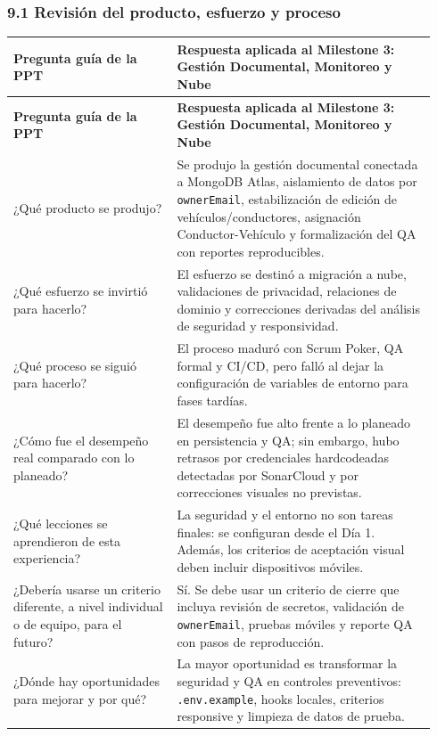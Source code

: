 \documentclass[11pt,a4paper]{article}
\begin{document}
\subsubsection{9.1 Revisión del producto, esfuerzo y proceso}

\begingroup
\small
\setlength{\tabcolsep}{3pt}
\begin{longtable}{P{0.36\linewidth}P{0.58\linewidth}}
\toprule
\textbf{Pregunta guía de la PPT} & \textbf{Respuesta aplicada al Milestone 3: Gestión Documental, Monitoreo y Nube} \\
\midrule
\endfirsthead
\toprule
\textbf{Pregunta guía de la PPT} & \textbf{Respuesta aplicada al Milestone 3: Gestión Documental, Monitoreo y Nube} \\
\midrule
\endhead
\bottomrule
\endlastfoot
¿Qué producto se produjo? & Se produjo la gestión documental conectada a MongoDB Atlas, aislamiento de datos por \texttt{ownerEmail}, estabilización de edición de vehículos/conductores, asignación Conductor-Vehículo y formalización del QA con reportes reproducibles. \\
¿Qué esfuerzo se invirtió para hacerlo? & El esfuerzo se destinó a migración a nube, validaciones de privacidad, relaciones de dominio y correcciones derivadas del análisis de seguridad y responsividad. \\
¿Qué proceso se siguió para hacerlo? & El proceso maduró con Scrum Poker, QA formal y CI/CD, pero falló al dejar la configuración de variables de entorno para fases tardías. \\
¿Cómo fue el desempeño real comparado con lo planeado? & El desempeño fue alto frente a lo planeado en persistencia y QA; sin embargo, hubo retrasos por credenciales hardcodeadas detectadas por SonarCloud y por correcciones visuales no previstas. \\
¿Qué lecciones se aprendieron de esta experiencia? & La seguridad y el entorno no son tareas finales: se configuran desde el Día 1. Además, los criterios de aceptación visual deben incluir dispositivos móviles. \\
¿Debería usarse un criterio diferente, a nivel individual o de equipo, para el futuro? & Sí. Se debe usar un criterio de cierre que incluya revisión de secretos, validación de \texttt{ownerEmail}, pruebas móviles y reporte QA con pasos de reproducción. \\
¿Dónde hay oportunidades para mejorar y por qué? & La mayor oportunidad es transformar la seguridad y QA en controles preventivos: \texttt{.env.example}, hooks locales, criterios responsive y limpieza de datos de prueba. \\

\end{longtable}
\end{document}
